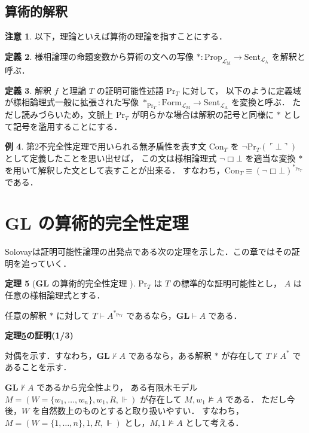 \documentclass{jsarticle}
\makeatletter
\newcommand*{\Lang}[1]{\mathcal{L}_\mathrm{#1}}
\newcommand*{\LangA}{\Lang{A}}
\newcommand*{\LangM}{\Lang{M}}
\newcommand*{\Logic}[1]{\mathbf{#1}}
\newcommand*{\LogicGL}{\Logic{GL}}
\newcommand*{\Prop}{\mathrm{Prop}}
\newcommand*{\Form}{\mathrm{Form}}
\newcommand*{\Sent}{\mathrm{Sent}}
\newcommand*{\Provable}{\mathrm{Pr}}
\theoremstyle{definition}
\newtheorem{theorem}{定理}[section]
\newtheorem{definition}[theorem]{定義}
\newtheorem{remark}[theorem]{注意}
\newtheorem{example}[theorem]{例}
\renewcommand{\proofname}{証明}
\renewenvironment{proof}[1][\proofname]{\par
    \normalfont 
    \topsep6\p@\@plus6\p@\relax
    \trivlist
    \item\relax
    {\bfseries\gtfamily
    #1\@addpunct{.}}\hspace\labelsep\ignorespaces
    }{%
    \endtrivlist
    \@endpefalse
}
\makeatother
\begin{document}
\subsection{算術的解釈}

\begin{remark}
	以下，理論といえば算術の理論を指すことにする．
\end{remark}

\begin{definition}
	様相論理の命題変数から算術の文への写像 $* \colon \Prop_{\LangM} \to \Sent_{\LangA}$ を解釈と呼ぶ．
\end{definition}

\begin{definition}
	解釈 $f$ と理論 $T$ の証明可能性述語 $\Provable_T$ に対して，
	以下のように定義域が様相論理式一般に拡張された写像 $*_{\Provable_T} \colon \Form_{\LangM} \to \Sent_{\LangA}$ を変換と呼ぶ．
	ただし読みづらいため，文脈上 $\Provable_T$ が明らかな場合は解釈の記号と同様に $*$ として記号を濫用することにする．
\end{definition}

\begin{example}
	第2不完全性定理で用いられる無矛盾性を表す文 $\mathrm{Con}_T$ を $\lnot \Provable_T(\ulcorner \bot \urcorner)$ として定義したことを思い出せば，
	この文は様相論理式 $\lnot \Box \bot$ を適当な変換 $*$ を用いて解釈した文として表すことが出来る．
	すなわち，$\mathrm{Con}_T \equiv (\lnot \Box \bot)^{*_{\Provable_T}}$ である．
\end{example}



\section{$\LogicGL$ の算術的完全性定理}

Solovay\cite{solovay_provability_1976}は証明可能性論理の出発点である次の定理を示した．この章ではその証明を追っていく．

\begin{theorem}[$\LogicGL$ の算術的完全性定理 \cite*{solovay_provability_1976}]\label{thm:GL_arith_completeness}
	$\Provable_T$ は $T$ の標準的な証明可能性とし，
	$A$ は任意の様相論理式とする．

	任意の解釈 $*$ に対して $T \vdash A^{*_{\Provable_T}}$ であるなら，$\LogicGL \vdash A$ である．
\end{theorem}

\begin{proof}[定理\ref{thm:GL_arith_completeness}の証明(1/3)]
	対偶を示す．すなわち，$\LogicGL \nvdash A$ であるなら，ある解釈 $*$ が存在して $T \nvdash A^*$ であることを示す．

	$\LogicGL \nvdash A$ であるから完全性より，
	ある有限木モデル $M = (W = \{w_1, \dots, w_n\}, w_1, R, \Vdash)$ が存在して $M,w_1 \nvDash A$ である．
	ただし今後，$W$ を自然数上のものとすると取り扱いやすい．
	すなわち，$M = (W = \{1,\dots,n\}, 1, R, \Vdash)$ とし，$M,1 \nvDash A$ として考える．
\end{proof}
\end{document}
